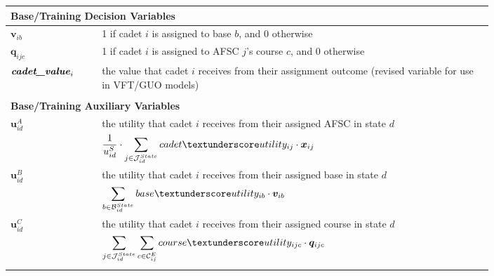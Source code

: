 \documentclass{article}
\begin{document}
\begin{tabular}{p{0.15\linewidth}p{0.65\linewidth}}
    \\[5pt]
    \multicolumn{2}{l}{\textbf{Base/Training Decision Variables}}\\
    \hline
        $\bm{v}_{ib}$ & 1 if cadet $i$ is assigned to base $b$, and 0 otherwise  \\
        $\bm{q}_{ijc}$ & 1 if cadet $i$ is assigned to AFSC $j$'s course $c$, and 0 otherwise  \\
        $\textbf{\textit{cadet\textunderscore value}}_i$ & the value that cadet $i$ receives from their assignment outcome (revised variable for use in VFT/GUO models)\\

    \\[5pt]
    \multicolumn{2}{l}{\textbf{Base/Training Auxiliary Variables}}\\
    \hline
        $\bm{u}^{A}_{id}$ & the utility that cadet $i$ receives from their assigned AFSC in state $d$\\
        & \; \; \; \; $\dfrac{1}{u^S_{id}} \cdot \displaystyle\sum_{j \in \mathcal{J}^{State}_{id}} cadet\textunderscore utility_{ij} \cdot \bm{x}_{ij}$\\
        $\bm{u}^{B}_{id}$ & the utility that cadet $i$ receives from their assigned base in state $d$\\
        & \; \; \; \; $\displaystyle\sum_{b \in \mathcal{B}^{State}_{id}} base\textunderscore utility_{ib} \cdot \bm{v}_{ib}$\\
        $\bm{u}^{C}_{id}$ & the utility that cadet $i$ receives from their assigned course in state $d$\\
        & \; \; \; \; $\displaystyle\sum_{j \in \mathcal{J}^{State}_{id}} \sum_{c \in \mathcal{C}^E_{ij}} course\textunderscore utility_{ijc} \cdot \bm{q}_{ijc}$\\
    \\[5pt]
\end{tabular}
\end{document}
